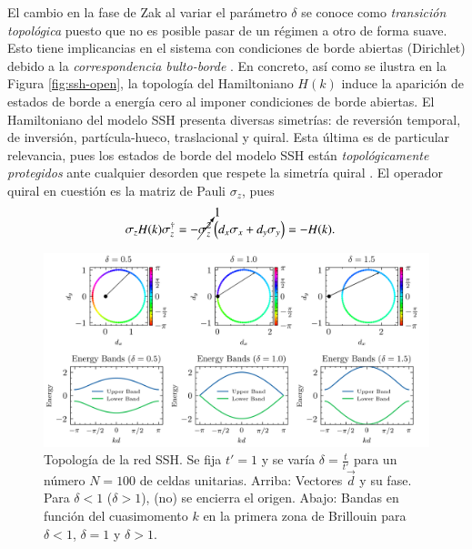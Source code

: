 El cambio en la fase de Zak al variar el parámetro $\delta$  se conoce como \textit{transición topológica} puesto que no es posible pasar de un régimen a otro de forma suave. Esto tiene implicancias en el sistema con condiciones de borde abiertas (Dirichlet) debido a la \textit{correspondencia bulto-borde} \cite{topobulk}. En concreto, así como se ilustra en la Figura \ref{fig:ssh-open}, la topología del Hamiltoniano $H(k)$ induce la aparición de estados de borde a energía cero al imponer condiciones de borde abiertas.
El Hamiltoniano del modelo SSH presenta diversas simetrías: de reversión temporal, de inversión, partícula-hueco, traslacional y quiral. Esta última es de particular relevancia, pues los estados de borde del modelo SSH están \textit{topológicamente protegidos} ante cualquier desorden que respete la simetría quiral \cite{ssh-course}. El operador quiral en cuestión es la matriz de Pauli $\sigma_z$, pues 
\begin{align*}
	\sigma_z H(k) \sigma_z^\dagger &=  -\cancelto{1}{\sigma_z^2} \left(d_x \sigma_x  + d_y \sigma_y\right)  =- H(k).
\end{align*}
\begin{figure}[h]
	\centering
	\includegraphics[width=\linewidth]{media/ssh-winding}
	\caption[Topología de la red SSH.]{Topología de la red SSH. Se fija $t'=1$ y se varía $\delta=\frac{t}{t'}$ para un número $N=100$ de celdas unitarias. Arriba: Vectores $\vec{d}$ y su fase. Para $\delta < 1$ ($\delta > 1$), (no) se encierra el origen. Abajo: Bandas en función del cuasimomento $k$ en la primera zona de Brillouin para $\delta < 1$, $\delta = 1$ y $\delta > 1$. 
	\label{fig:ssh-topo}}
\end{figure} 
